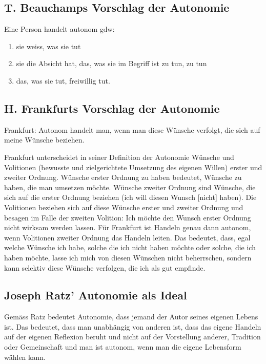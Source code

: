 \documentclass[../main.tex]{subfiles}
\begin{document}
\subsection{T. Beauchamps Vorschlag der Autonomie}\label{beauchampsautonomie}
Eine Person handelt autonom gdw:
\begin{enumerate}[label=(\alph*)]
	\item sie weiss, was sie tut
	\item sie die Absicht hat, das, was sie im Begriff ist zu tun, zu tun
	\item das, was sie tut, freiwillig tut.
\end{enumerate}

\subsection{H. Frankfurts Vorschlag der Autonomie}
\begin{warningbox}
Frankfurt: Autonom handelt man, wenn man diese Wünsche verfolgt, die sich auf meine Wünsche beziehen. 	
\end{warningbox}

Frankfurt unterscheidet in seiner Definition der Autonomie Wünsche und Volitionen (bewusste und zielgerichtete Umsetzung des eigenen Willen) erster und zweiter Ordnung. Wünsche erster Ordnung zu haben bedeutet, Wünsche zu haben, die man umsetzen möchte. Wünsche zweiter Ordnung sind Wünsche, die sich auf die erster Ordnung beziehen (ich will diesen Wunsch [nicht] haben). Die Volitionen beziehen sich auf diese Wünsche erster und zweiter Ordnung und besagen im Falle der zweiten Volition: Ich möchte den Wunsch erster Ordnung nicht wirksam werden lassen. Für Frankfurt ist Handeln genau dann autonom, wenn Volitionen zweiter Ordnung das Handeln leiten. Das bedeutet, dass, egal welche Wünsche ich habe, solche die ich nicht haben möchte oder solche, die ich haben möchte, lasse ich mich von diesen Wünschen nicht beherrschen, sondern kann selektiv diese Wünsche verfolgen, die ich als gut empfinde.

\subsection{Joseph Ratz' Autonomie als Ideal}\label{ratzautonomieideal}
Gemäss Ratz bedeutet Autonomie, dass jemand der Autor seines eigenen Lebens ist. Das bedeutet, dass man unabhängig von anderen ist, dass das eigene Handeln auf der eigenen Reflexion beruht und nicht auf der Vorstellung anderer, Tradition oder Gemeinschaft und man ist autonom, wenn man die eigene Lebensform wählen kann. 
\end{document}
